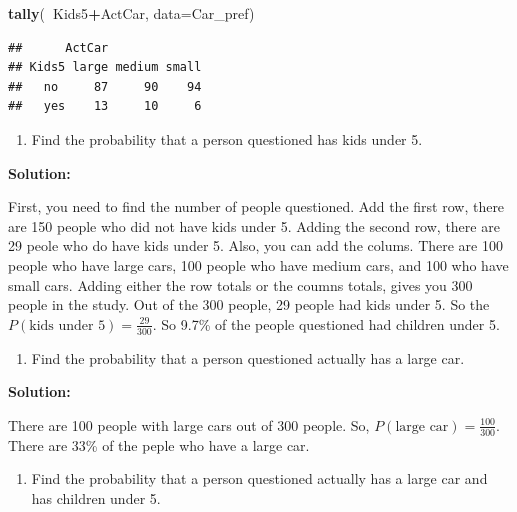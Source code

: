 \documentclass[
]{book}
\newenvironment{Shaded}{\begin{snugshade}}{\end{snugshade}}
\newcommand{\DataTypeTok}[1]{\textcolor[rgb]{0.13,0.29,0.53}{#1}}
\newcommand{\KeywordTok}[1]{\textcolor[rgb]{0.13,0.29,0.53}{\textbf{#1}}}
\newcommand{\NormalTok}[1]{#1}
\newcommand{\OperatorTok}[1]{\textcolor[rgb]{0.81,0.36,0.00}{\textbf{#1}}}
\providecommand{\tightlist}{%
  \setlength{\itemsep}{0pt}\setlength{\parskip}{0pt}}
\begin{document}
\begin{Shaded}
\begin{Highlighting}[]
\KeywordTok{tally}\NormalTok{(}\OperatorTok{~}\NormalTok{Kids5}\OperatorTok{+}\NormalTok{ActCar, }\DataTypeTok{data=}\NormalTok{Car_pref)}
\end{Highlighting}
\end{Shaded}

\begin{verbatim}
##      ActCar
## Kids5 large medium small
##   no     87     90    94
##   yes    13     10     6
\end{verbatim}

\begin{enumerate}
\def\labelenumi{\alph{enumi}.}
\tightlist
\item
  Find the probability that a person questioned has kids under 5.
\end{enumerate}

\textbf{Solution: }

First, you need to find the number of people questioned. Add the first row, there are 150 people who did not have kids under 5. Adding the second row, there are 29 peole who do have kids under 5. Also, you can add the colums. There are 100 people who have large cars, 100 people who have medium cars, and 100 who have small cars. Adding either the row totals or the coumns totals, gives you 300 people in the study. Out of the 300 people, 29 people had kids under 5. So the \(P(\text{kids under 5})=\frac{29}{300}\). So 9.7\% of the people questioned had children under 5.

\begin{enumerate}
\def\labelenumi{\alph{enumi}.}
\setcounter{enumi}{1}
\tightlist
\item
  Find the probability that a person questioned actually has a large car.
\end{enumerate}

\textbf{Solution:}

There are 100 people with large cars out of 300 people. So, \(P(\text{large car})= \frac{100}{300}\). There are 33\% of the peple who have a large car.

\begin{enumerate}
\def\labelenumi{\alph{enumi}.}
\setcounter{enumi}{2}
\tightlist
\item
  Find the probability that a person questioned actually has a large car and has children under 5.
\end{enumerate}
\end{document}
